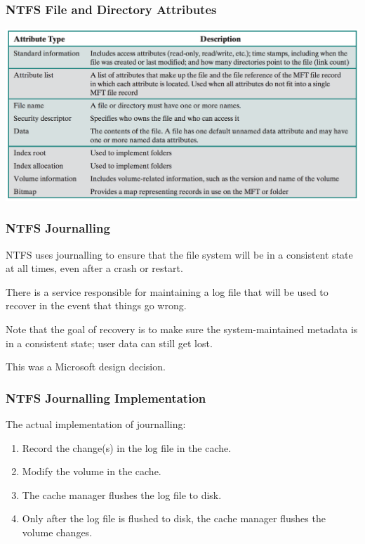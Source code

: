 \begin{frame}
\frametitle{NTFS File and Directory Attributes}

\begin{center}
	\includegraphics[width=\textwidth]{images/ntfs-attrs.png}
\end{center}


\end{frame}

\begin{frame}
\frametitle{NTFS Journalling}

NTFS uses journalling to ensure that the file system will be in a consistent state at all times, even after a crash or restart. 

There is a service responsible for maintaining a log file that will be used to recover in the event that things go wrong.  

Note that the goal of recovery is to make sure the system-maintained metadata is in a consistent state; user data can still get lost. 

This was a Microsoft design decision.


\end{frame}

\begin{frame}
\frametitle{NTFS Journalling Implementation}

The actual implementation of journalling:

\begin{enumerate}
	\item Record the change(s) in the log file in the cache.
	\item Modify the volume in the cache.
	\item The cache manager flushes the log file to disk.
	\item Only after the log file is flushed to disk, the cache manager flushes the volume changes.
\end{enumerate}

\end{frame}

